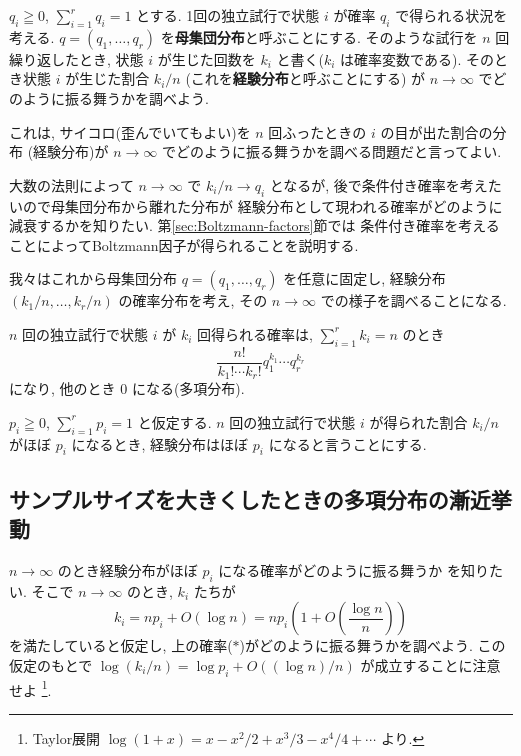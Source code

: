 \documentclass[12pt,twoside]{jarticle}
\theoremstyle{jplain}
\theoremstyle{jplain}
\theoremstyle{jplain}
\numberwithin{theorem}{section}
\numberwithin{equation}{section}
\numberwithin{figure}{section}
\numberwithin{table}{section}
\newcommand\secref[1]{第\ref{#1}節}
\begin{document}
$q_i\geqq 0$, $\sum_{i=1}^r q_i=1$ とする.
1回の独立試行で状態 $i$ が確率 $q_i$ で得られる状況を考える.
$q=(q_1,\ldots,q_r)$ を{\bf 母集団分布}と呼ぶことにする.
そのような試行を $n$ 回繰り返したとき, 
状態 $i$ が生じた回数を $k_i$ と書く($k_i$ は確率変数である).
そのとき状態 $i$ が生じた割合 $k_i/n$ (これを{\bf 経験分布}と呼ぶことにする)
が $n\to\infty$ でどのように振る舞うかを調べよう.

これは, サイコロ(歪んでいてもよい)を $n$ 回ふったときの $i$ の目が出た割合の分布
(経験分布)が $n\to\infty$ でどのように振る舞うかを調べる問題だと言ってよい.

大数の法則によって $n\to\infty$ で $k_i/n\to q_i$ となるが,
後で条件付き確率を考えたいので母集団分布から離れた分布が
経験分布として現われる確率がどのように減衰するかを知りたい.
\secref{sec:Boltzmann-factors}では
条件付き確率を考えることによってBoltzmann因子が得られることを説明する.

我々はこれから母集団分布 $q=(q_1,\ldots,q_r)$ を任意に固定し, 
経験分布 $(k_1/n,\ldots,k_r/n)$ の確率分布を考え,
その $n\to\infty$ での様子を調べることになる.

$n$ 回の独立試行で状態 $i$ が $k_i$ 回得られる確率は, 
$\sum_{i=1}^r k_i=n$ のとき
\[
\frac{n!}{k_1!\cdots k_r!} q_1^{k_1}\cdots q_r^{k_r}
\tag{$*$}
\]
になり, 他のとき $0$ になる(多項分布).

$p_i\geqq 0$, $\sum_{i=1}^r p_i=1$ と仮定する.
$n$ 回の独立試行で状態 $i$ が得られた割合 $k_i/n$ がほぼ $p_i$ になるとき, 
経験分布はほぼ $p_i$ になると言うことにする.


\subsection{サンプルサイズを大きくしたときの多項分布の漸近挙動}
\label{sec:log}

$n\to\infty$ のとき経験分布がほぼ $p_i$ になる確率がどのように振る舞うか
を知りたい. そこで $n\to\infty$ のとき, $k_i$ たちが
\[
k_i= np_i+O(\log n) = np_i\left(1 + O\left(\frac{\log n}{n}\right)\right) 
\tag{$**$}
\]
を満たしていると仮定し, 上の確率($*$)がどのように振る舞うかを調べよう.
この仮定のもとで $\log(k_i/n)=\log p_i+O((\log n)/n)$ が成立することに注意せよ%
\footnote{Taylor展開 $\log(1+x)=x-x^2/2+x^3/3-x^4/4+\cdots$ より.}.
\end{document}
